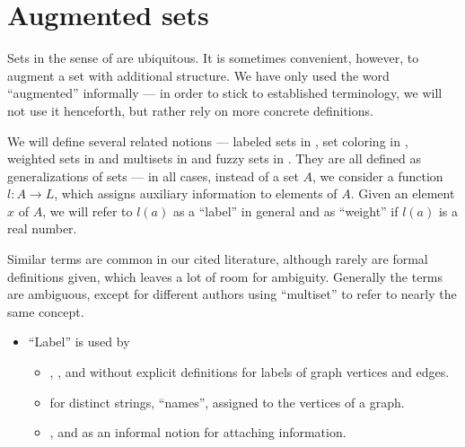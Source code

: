 \section{Augmented sets}\label{sec:augmented_sets}

Sets in the sense of  are ubiquitous. It is sometimes convenient, however, to augment a set with additional structure. We have only used the word \enquote{augmented} informally --- in order to stick to established terminology, we will not use it henceforth, but rather rely on more concrete definitions.

\begin{remark}\label{rem:set_labeling_terminology}
  We will define several related notions --- labeled sets in , set coloring in , weighted sets in  and multisets in  and fuzzy sets in . They are all defined as generalizations of sets --- in all cases, instead of a set \( A \), we consider a function \( l: A \to L \), which assigns auxiliary information to elements of \( A \). Given an element \( x \) of \( A \), we will refer to \( l(a) \) as a \enquote{label} in general and as \enquote{weight} if \( l(a) \) is a real number.

  Similar terms are common in our cited literature, although rarely are formal definitions given, which leaves a lot of room for ambiguity. Generally the terms are ambiguous, except for different authors using \enquote{multiset} to refer to nearly the same concept.

  \begin{itemize}
    \item \enquote{Label} is used by
    \begin{itemize}
      \item {},  ,  and  without explicit definitions for labels of graph vertices and edges.

      \item {} for distinct strings, \enquote{names}, assigned to the vertices of a graph.

      \item {},  and  as an informal notion for attaching information.


\end{itemize}
\end{itemize}
\end{remark}
